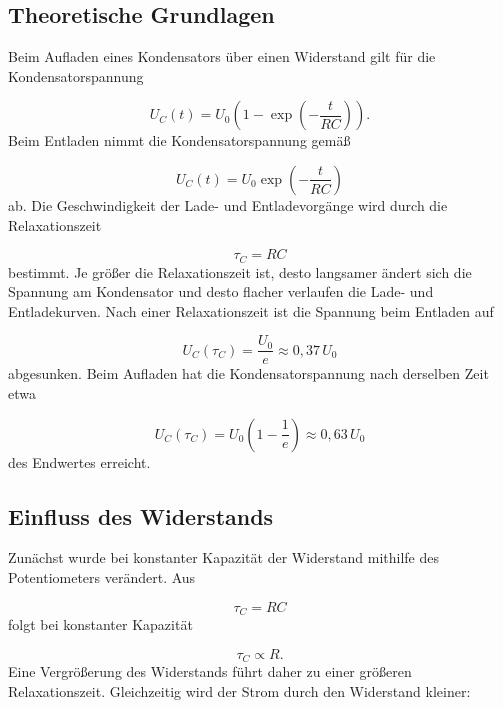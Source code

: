 \documentclass{report}
\begin{document}
\subsection{Theoretische Grundlagen}
\noindent
Beim Aufladen eines Kondensators über einen Widerstand gilt für die Kondensatorspannung

\begin{equation}
U_C(t)
=
U_0
\left(
1-\exp\left(-\frac{t}{RC}\right)
\right).
\end{equation}
\noindent
Beim Entladen nimmt die Kondensatorspannung gemäß

\begin{equation}
U_C(t)
=
U_0
\exp\left(-\frac{t}{RC}\right)
\end{equation}
\noindent
ab.
\noindent
Die Geschwindigkeit der Lade- und Entladevorgänge wird durch die Relaxationszeit

\begin{equation}
\boxed{\tau_C=RC}
\end{equation}
\noindent
bestimmt. Je größer die Relaxationszeit ist, desto langsamer ändert sich die Spannung am Kondensator und desto flacher verlaufen die Lade- und Entladekurven.
\noindent
Nach einer Relaxationszeit ist die Spannung beim Entladen auf

\begin{equation}
U_C(\tau_C)
=
\frac{U_0}{e}
\approx
0{,}37\,U_0
\end{equation}
\noindent
abgesunken. Beim Aufladen hat die Kondensatorspannung nach derselben Zeit etwa

\begin{equation}
U_C(\tau_C)
=
U_0
\left(
1-\frac{1}{e}
\right)
\approx
0{,}63\,U_0
\end{equation}
\noindent
des Endwertes erreicht.

\subsection{Einfluss des Widerstands}
\noindent
Zunächst wurde bei konstanter Kapazität der Widerstand mithilfe des Potentiometers verändert. Aus

\begin{equation}
\tau_C=RC
\end{equation}
\noindent
folgt bei konstanter Kapazität

\begin{equation}
\tau_C\propto R.
\end{equation}
\noindent
Eine Vergrößerung des Widerstands führt daher zu einer größeren Relaxationszeit. Gleichzeitig wird der Strom durch den Widerstand kleiner:
\end{document}
